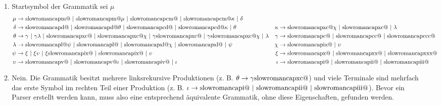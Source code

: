 \documentclass[a4paper,10pt]{scrartcl}
\makeatletter
\newcommand{\Rm}[1]{\textrm{\expandafter\@slowromancap\romannumeral #1@}}
\makeatother
\begin{document}
\section{}
\begin{enumerate}
 \item  Startsymbol der Grammatik sei $\mu$
        \begin{align*}
         \mu &\to \Rm{1000}\ |\ \Rm{1000}\mu\ |\ \Rm{900}\ |\ \Rm{900}\kappa\ |\ \delta && \\
         \delta &\to \Rm{500}\ |\ \Rm{500}\theta\ |\ \Rm{400}\ |\ \Rm{400}\kappa\ |\ \theta &
            \kappa &\to \Rm{90}\chi\ |\ \Rm{90}\ |\ \lambda \\
        \theta &\to \gamma\ |\ \gamma\lambda\ |\ \Rm{90}\ |\ \Rm{90}\chi\ |\ \gamma \Rm{90}\ |\ \gamma \Rm{90}\chi\ |\ \lambda &
            \gamma &\to \Rm{100}\ |\ \Rm{200}\ |\ \Rm{300} \\
        \lambda &\to \Rm{50}\psi\ |\ \Rm{50}\ |\ \Rm{40}\chi\ |\ \Rm{40}\ |\ \psi &
            \chi &\to \Rm{9}\ |\ \upsilon \\
        \psi &\to \xi\ |\ \xi\upsilon\ |\ \xi \Rm{9}\ |\ \Rm{9}\ |\ \upsilon &
            \xi &\to \Rm{10}\ |\ \Rm{20}\ |\ \Rm{30} \\
        \upsilon &\to \Rm{5}\ |\ \Rm{5}\iota\ |\ \Rm{4}\ |\ \iota &
            \iota &\to \Rm{1}\ |\ \Rm{2}\ |\ \Rm{3}
        \end{align*}
 \item  Nein. Die Grammatik besitzt mehrere linksrekursive Produktionen (z. B. $\theta \to \gamma\Rm{90}$) und viele Terminale  
        sind mehrfach das erste Symbol im rechten Teil einer Produktion (z. B. $\iota \to \Rm{1}\ |\ \Rm{2}\ |\ \Rm{3}$).
        Bevor ein Parser erstellt werden kann, muss also eine entsprechend äquivalente Grammatik, ohne diese Eigenschaften, gefunden werden.
\end{enumerate}
\end{document}
